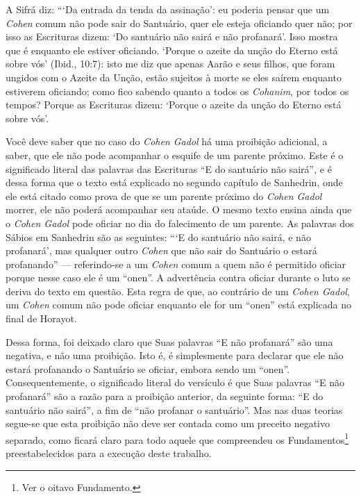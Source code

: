 A Sifrá diz: ```Da entrada da tenda da assinação': eu poderia pensar que
um \textit{Cohen} comum não pode sair do Santuário, quer ele esteja oficiando
quer não; por isso as Escrituras dizem: `Do santuário não sairá e não
profanará'. Isso mostra que é enquanto ele estiver oficiando. `Porque o
azeite da unção do Eterno está sobre vós' (Ibid., 10:7): isto me diz que
apenas Aarão e seus filhos, que foram ungidos com o Azeite da Unção,
estão sujeitos à morte se eles saírem enquanto estiverem oficiando; como
fico sabendo quanto a todos os \textit{Cohanim}, por todos os tempos? Porque as
Escrituras dizem: `Porque o azeite da unção do Eterno está sobre
vós'.

Você deve saber que no caso do \textit{Cohen Gadol} há uma proibição
adicional, a saber, que ele não pode acompanhar o esquife de um parente
próximo. Este é o significado literal das palavras das Escrituras ``E do
santuário não sairá'', e é dessa forma que o texto está explicado no
segundo capítulo de Sanhedrin, onde ele está citado como prova de que
se um parente próximo do \textit{Cohen Gadol} morrer, ele não poderá
acompanhar seu ataúde. O mesmo texto ensina ainda que o \textit{Cohen Gadol}
pode oficiar no dia do falecimento de um parente. As palavras dos Sábios
em Sanhedrin são as seguintes: ```E do santuário não sairá, e não
profanará', mas qualquer outro \textit{Cohen} que não sair do Santuário o
estará profanando'' --- referindo-se a um \textit{Cohen} comum a quem não é
permitido oficiar porque nesse caso ele é um ``onen''. A advertência
contra oficiar durante o luto se deriva do texto em questão. Esta regra
de que, ao contrário de um \textit{Cohen Gadol}, um \textit{Cohen} comum não pode
oficiar enquanto ele for um ``onen'' está explicada no final de
Horayot.

Dessa forma, foi deixado claro que Suas palavras ``E não profanará''
são uma negativa, e não uma proibição. Isto é, é simplesmente para
declarar que ele não estará profanando o Santuário se oficiar, embora sendo um
``onen''.
Consequentemente, o significado literal do versículo é que Suas palavras
``E não profanará'' são a razão para a proibição anterior, da seguinte
forma: ``E do santuário não sairá'', a fim de ``não profanar o santuário''.
Mas nas duas teorias segue-se que esta proibição não deve ser contada
como um preceito negativo separado, como ficará claro para todo aquele
que compreendeu os Fundamentos\footnote{Ver o oitavo Fundamento.} preestabelecidos
para a execução deste trabalho.

